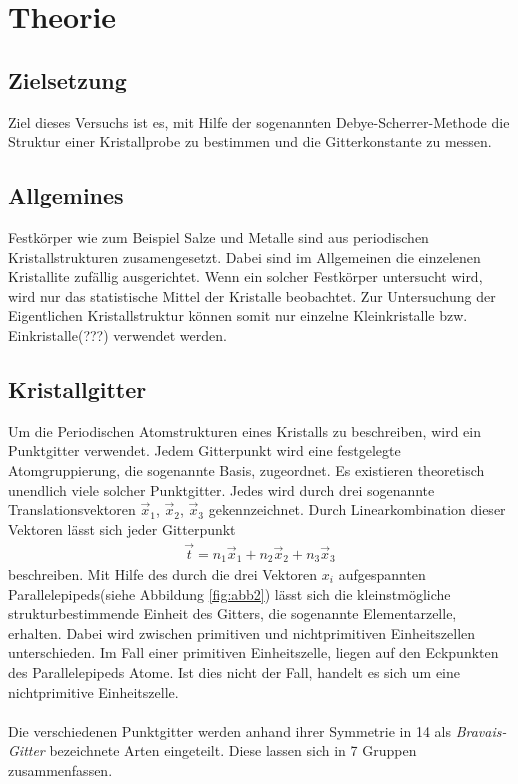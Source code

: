 \section{Theorie}
\label{sec:Theorie}

\subsection{Zielsetzung}
\label{subsec:Zielsetzung}
Ziel dieses Versuchs ist es, mit Hilfe der sogenannten
Debye-Scherrer-Methode die Struktur einer Kristallprobe
zu bestimmen und die Gitterkonstante zu messen.

\subsection{Allgemines}
\label{subsec:allgemein}

Festkörper wie zum Beispiel Salze und Metalle
sind aus periodischen
Kristallstrukturen zusamengesetzt. Dabei sind im
Allgemeinen die einzelenen Kristallite zufällig
ausgerichtet. Wenn ein solcher Festkörper untersucht wird,
wird nur das statistische Mittel der Kristalle beobachtet.
Zur Untersuchung der Eigentlichen Kristallstruktur
können somit nur einzelne Kleinkristalle bzw.
Einkristalle(???) verwendet werden.


\subsection{Kristallgitter}
\label{subsec:kristallstrukturen}
Um die Periodischen Atomstrukturen eines Kristalls
zu beschreiben, wird ein Punktgitter verwendet.
Jedem Gitterpunkt wird eine festgelegte Atomgruppierung,
die sogenannte Basis, zugeordnet.
Es existieren theoretisch unendlich viele solcher Punktgitter.
Jedes wird durch drei sogenannte Translationsvektoren
$\vec{x}_{1}$, $\vec{x}_{2}$, $\vec{x}_{3}$ gekennzeichnet.
Durch Linearkombination dieser Vektoren lässt sich
jeder Gitterpunkt
\begin{align}
  \label{eqn:1}
  \vec{t} = n_{1} \vec{x}_{1} + n_{2} \vec{x}_{2} + n_{3} \vec{x}_{3}
\end{align}
beschreiben.
Mit Hilfe des durch die drei Vektoren $x_{i}$ aufgespannten
Parallelepipeds(siehe Abbildung \ref{fig:abb2}) lässt sich die
kleinstmögliche strukturbestimmende Einheit des Gitters,
die sogenannte Elementarzelle, erhalten.
Dabei wird zwischen primitiven und nichtprimitiven Einheitszellen
unterschieden. Im Fall einer primitiven Einheitszelle,
liegen auf den Eckpunkten des Parallelepipeds Atome.
Ist dies nicht der Fall, handelt es sich um eine
nichtprimitive Einheitszelle.\\ \\
Die verschiedenen Punktgitter werden anhand ihrer Symmetrie
in 14 als \textit{Bravais-Gitter} bezeichnete Arten eingeteilt.
Diese lassen sich in 7 Gruppen zusammenfassen.
